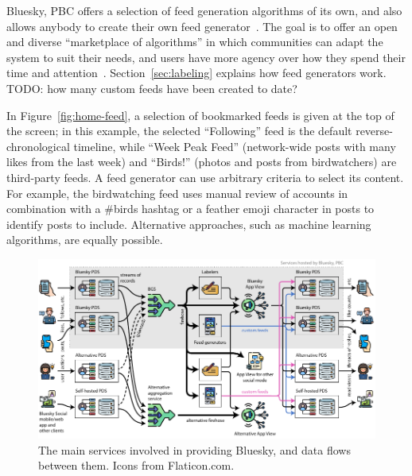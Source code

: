 \documentclass[sigconf,review]{acmart}
\begin{document}
Bluesky, PBC offers a selection of feed generation algorithms of its own, and also allows anybody to create their own feed generator~\cite{CustomFeeds}.
The goal is to offer an open and diverse ``marketplace of algorithms'' in which communities can adapt the system to suit their needs, and users have more agency over how they spend their time and attention~\cite{AlgorithmicChoice}.
Section~\ref{sec:labeling} explains how feed generators work.
TODO: how many custom feeds have been created to date?

In Figure~\ref{fig:home-feed}, a selection of bookmarked feeds is given at the top of the screen; in this example, the selected ``Following'' feed is the default reverse-chronological timeline, while ``Week Peak Feed'' (network-wide posts with many likes from the last week) and ``Birds!'' (photos and posts from birdwatchers) are third-party feeds.
A feed generator can use arbitrary criteria to select its content.
For example, the birdwatching feed uses manual review of accounts in combination with a \#birds hashtag or a feather emoji character in posts to identify posts to include.
Alternative approaches, such as machine learning algorithms, are equally possible.

\begin{figure}
    \centering
    \includegraphics[width=\linewidth]{architecture.pdf}
    \caption{The main services involved in providing Bluesky, and data flows between them. Icons from Flaticon.com.}
    \label{fig:indexing}
\end{figure}
\end{document}
